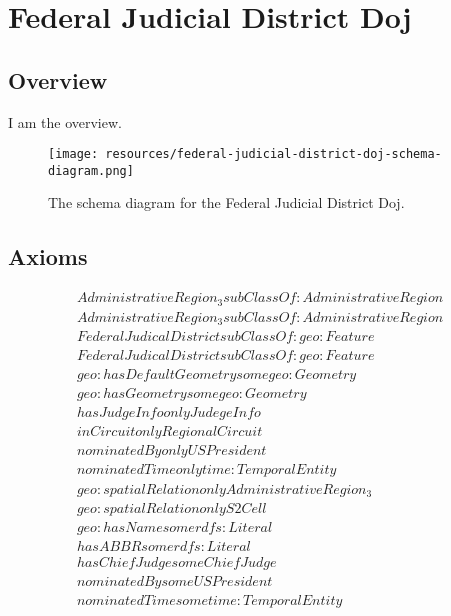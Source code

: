 
\section{Federal Judicial District Doj}
\label{sec:federal-judicial-district-doj}
\subsection{Overview}
\label{ssec:overview}

I am the overview.

\begin{figure}[h!]
  \begin{center}
    \texttt{[image: resources/federal-judicial-district-doj-schema-diagram.png]}
  \end{center}
  \caption{The schema diagram for the Federal Judicial District Doj.}
  \label{fig:ov-diagram}
\end{figure}


\subsection{Axioms}
\begin{align}
  AdministrativeRegion_3 subClassOf: AdministrativeRegion\\
  AdministrativeRegion_3 subClassOf: AdministrativeRegion\\
  FederalJudicalDistrict subClassOf: geo:Feature\\
  FederalJudicalDistrict subClassOf: geo:Feature\\
  geo:hasDefaultGeometry some geo:Geometry \\
  geo:hasGeometry some geo:Geometry \\
  hasJudgeInfo only JudegeInfo \\
  inCircuit only RegionalCircuit \\
  nominatedBy only USPresident \\
  nominatedTime only time:TemporalEntity \\
  geo:spatialRelation only AdministrativeRegion_3 \\
  geo:spatialRelation only S2Cell \\
  geo:hasName some rdfs:Literal \\
  hasABBR some rdfs:Literal \\
  hasChiefJudge some ChiefJudge \\
  nominatedBy some USPresident \\
  nominatedTime some time:TemporalEntity \end{align}


